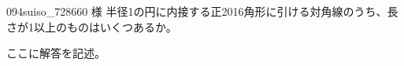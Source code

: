 \begin{thm}{094}{}{suiso\_728660 様}
 半径1の円に内接する正2016角形に引ける対角線のうち、長さが1以上のものはいくつあるか。
\end{thm}

ここに解答を記述。